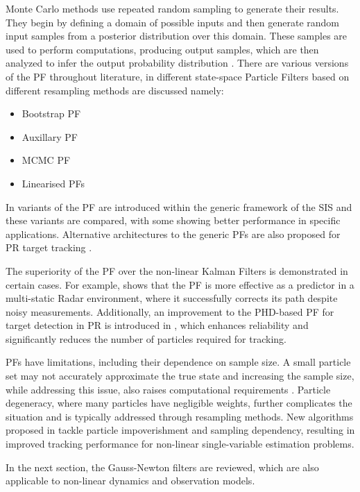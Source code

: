 Monte Carlo methods use repeated random sampling to generate their results. They begin by defining a domain of possible inputs and then generate random input samples from a posterior distribution over this domain. These samples are used to perform computations, producing output samples, which are then analyzed to infer the output probability distribution \cite{Hoffman}. There are various versions of the \ac{PF} throughout literature, in \cite{Hoffman} different state-space Particle Filters based on different resampling methods are discussed namely:
\begin{itemize}
    \item Bootstrap \ac{PF}
    \item Auxillary \ac{PF}
    \item \ac{MCMC} \ac{PF}
    \item Linearised \ac{PF}s
\end{itemize}
In \cite{Arulampalam2007} variants of the \ac{PF} are introduced within the generic framework of the \ac{SIS} and these variants are compared, with some showing better performance in specific applications. Alternative architectures to the generic \ac{PF}s are also proposed for \ac{PR} target tracking \cite{Zhao2013,Tobias2008}.

The superiority of the \ac{PF} over the non-linear Kalman Filters is demonstrated in certain cases. For example, \cite{Abdoul-Moaty2014} shows that the \ac{PF} is more effective as a predictor in a multi-static \ac{Radar} environment, where it successfully corrects its path despite noisy measurements. Additionally, an improvement to the \ac{PHD}-based \ac{PF} for target detection in \ac{PR} is introduced in \cite{Tobias2008}, which enhances reliability and significantly reduces the number of particles required for tracking.

\ac{PF}s have limitations, including their dependence on sample size. A small particle set may not accurately approximate the true state and increasing the sample size, while addressing this issue, also raises computational requirements \cite{Zhong2016}. Particle degeneracy, where many particles have negligible weights, further complicates the situation and is typically addressed through resampling methods. New algorithms proposed in \cite{Zhong2016} tackle particle impoverishment and sampling dependency, resulting in improved tracking performance for non-linear single-variable estimation problems.

In the next section, the Gauss-Newton filters are reviewed, which are also applicable to non-linear dynamics and observation models.

